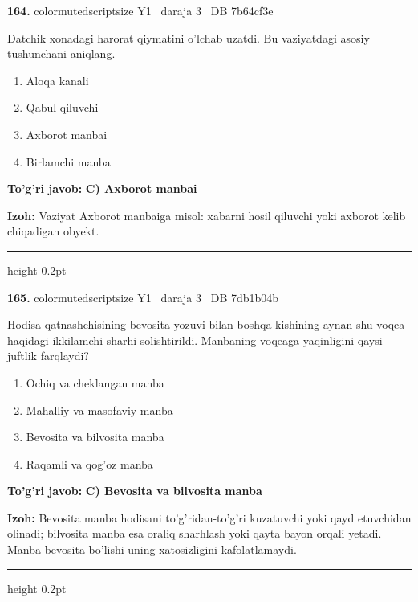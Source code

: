 \documentclass[10pt,a4paper,oneside]{article}
\begin{document}
\noindent\textbf{\color{ink}164.}  {color{muted}scriptsize Y1 \textbullet\ daraja 3 \textbullet\ DB 7b64cf3e}
\par
Datchik xonadagi harorat qiymatini o'lchab uzatdi. Bu vaziyatdagi asosiy tushunchani aniqlang.
\begin{enumerate}[label=\Alph*),leftmargin=9mm]
\item Aloqa kanali
\item Qabul qiluvchi
\item Axborot manbai
\item Birlamchi manba
\end{enumerate}
\begin{tcolorbox}[enhanced,breakable,colback=teal!4,colframe=teal!50!black,boxrule=0.5pt,arc=1.1mm,left=3mm,right=3mm,top=1.7mm,bottom=1.7mm,before skip=2mm,after skip=2mm]
\textbf{\color{teal}To'g'ri javob:} \textbf{C) Axborot manbai}
\par\smallskip
\textbf{Izoh:} Vaziyat Axborot manbaiga misol: xabarni hosil qiluvchi yoki axborot kelib chiqadigan obyekt.
\end{tcolorbox}
\vspace{2mm}\hrule height 0.2pt \vspace{3mm}

\noindent\textbf{\color{ink}165.}  {color{muted}scriptsize Y1 \textbullet\ daraja 3 \textbullet\ DB 7db1b04b}
\par
Hodisa qatnashchisining bevosita yozuvi bilan boshqa kishining aynan shu voqea haqidagi ikkilamchi sharhi solishtirildi. Manbaning voqeaga yaqinligini qaysi juftlik farqlaydi?
\begin{enumerate}[label=\Alph*),leftmargin=9mm]
\item Ochiq va cheklangan manba
\item Mahalliy va masofaviy manba
\item Bevosita va bilvosita manba
\item Raqamli va qog'oz manba
\end{enumerate}
\begin{tcolorbox}[enhanced,breakable,colback=teal!4,colframe=teal!50!black,boxrule=0.5pt,arc=1.1mm,left=3mm,right=3mm,top=1.7mm,bottom=1.7mm,before skip=2mm,after skip=2mm]
\textbf{\color{teal}To'g'ri javob:} \textbf{C) Bevosita va bilvosita manba}
\par\smallskip
\textbf{Izoh:} Bevosita manba hodisani to'g'ridan-to'g'ri kuzatuvchi yoki qayd etuvchidan olinadi; bilvosita manba esa oraliq sharhlash yoki qayta bayon orqali yetadi. Manba bevosita bo'lishi uning xatosizligini kafolatlamaydi.
\end{tcolorbox}
\vspace{2mm}\hrule height 0.2pt \vspace{3mm}
\end{document}
